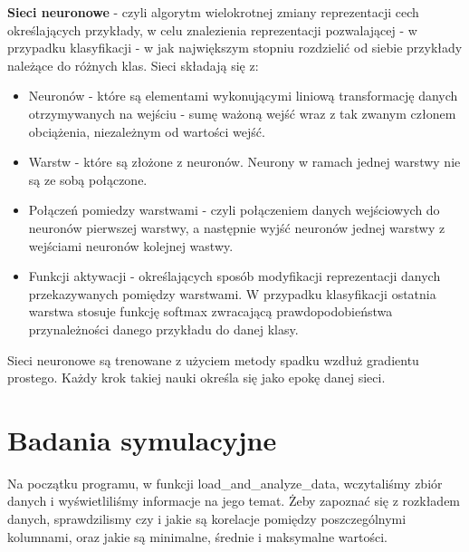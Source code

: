 \documentclass[11pt, a4paper, notitlepage]{report}
\begin{document}
	{\bf Sieci neuronowe} - czyli algorytm wielokrotnej zmiany reprezentacji cech określających przykłady, w celu znalezienia reprezentacji pozwalającej - w przypadku klasyfikacji - w jak największym stopniu rozdzielić od siebie przykłady należące do różnych klas. Sieci składają się z:
	\begin{itemize}
	  \item Neuronów - które są elementami wykonującymi liniową transformację danych otrzymywanych na wejściu - sumę ważoną wejść wraz z tak zwanym członem obciążenia, niezależnym od wartości wejść.
	  \item Warstw - które są złożone z neuronów. Neurony w ramach jednej warstwy nie są ze sobą połączone.
	  \item Połączeń pomiedzy warstwami - czyli połączeniem danych wejściowych do neuronów pierwszej warstwy, a następnie wyjść neuronów jednej warstwy z wejściami neuronów kolejnej wastwy.
	 \item Funkcji aktywacji - określających sposób modyfikacji reprezentacji danych przekazywanych pomiędzy warstwami. W przypadku klasyfikacji ostatnia warstwa stosuje funkcję softmax zwracającą prawdopodobieństwa przynależności danego przykładu do danej klasy.
	\end{itemize}
	Sieci neuronowe są trenowane z użyciem metody spadku wzdłuż gradientu prostego. Każdy krok takiej nauki określa się jako epokę danej sieci.

\newpage

\section{Badania symulacyjne}

Na początku programu, w funkcji load\_and\_analyze\_data, wczytaliśmy zbiór danych i wyświetliliśmy informacje na jego temat.
Żeby zapoznać się z rozkładem danych, sprawdzilismy czy i jakie są korelacje pomiędzy poszczególnymi kolumnami, oraz jakie są minimalne, średnie i maksymalne wartości. \\ \\
\end{document}
